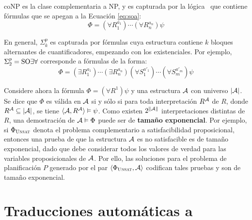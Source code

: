 coNP es la clase complementaria a NP, y es capturada por la lógica \SOA\ 
que contiene fórmulas que se apegan a la Ecuación \ref{eq:soa}:
\begin{equation}
\label{eq:soa}
\Phi = (\forall R_1^{a_1})\cdots(\forall R_n^{a_n})\psi
\end{equation}

En general, $\Sigma^p_k$ es capturada por fórmulas cuya estructura contiene $k$
bloques alternantes de cuantificadores, empezando con los existenciales. Por
ejemplo, $\Sigma^p_2=\text{SO}\exists\forall$ corresponde a fórmulas de la forma:
\begin{equation}
\Phi = (\exists R_1^{a_1}) \cdots (\exists R_n^{a_n}) 
       (\forall S_1^{a'_1}) \cdots (\forall S_m^{a'_m})
       \psi
\end{equation}

%

Considere ahora la fórmula $\Phi=(\forall R^1)\psi$
y una estructura $\mathcal{A}$ con universo $|\mathcal{A}|$.
Se dice que $\Phi$ es válida en $\mathcal{A}$ si y sólo si para toda
interpretación $R^{\mathcal{A}}$ de $R$, donde $R^{\mathcal{A}} \subseteq |\mathcal{A}|$, se tiene
$\langle \mathcal{A},R^{\mathcal{A}} \rangle\vDash\psi$. Como existen $2^{\|\mathcal{A}\|}$ interpretaciones
distintas de $R$, una demostración de $\mathcal{A}\vDash\Phi$ puede ser de
\textbf{tamaño exponencial}. Por ejemplo, si $\Phi_{\textsc{Unsat}}$ denota el problema
complementario a satisfacibilidad proposicional, entonces una prueba de que la
estructura $\mathcal{A}$ es no satisfacible es de tamaño exponencial, dado que debe
considerar todos los valores de verdad para las variables proposicionales de
$\mathcal{A}$. Por ello, las soluciones para el problema de planificación $P$ generado
por el par $\langle \Phi_{\textsc{Unsat}},\mathcal{A} \rangle$ codifican tales pruebas y son de tamaño
exponencial.

\section{Traducciones automáticas a \STRIPS}

